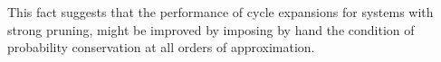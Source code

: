 {%
%
%
%
%
%
%
%
This fact suggests that the performance of cycle expansions for
systems with strong pruning, might be improved by imposing by hand the
condition of probability conservation at all orders of approximation.

}
